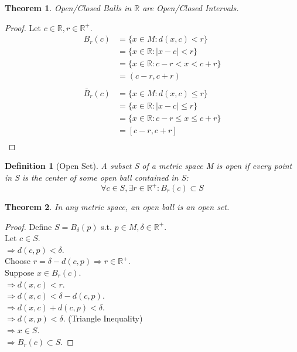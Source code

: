 \documentclass{article}
\newtheorem{definition}{Definition}[section]
\newtheorem{theorem}{Theorem}[section]
\begin{document}
			\begin{theorem}
				Open/Closed Balls in $\mathbb{R}$ are Open/Closed Intervals.
			\end{theorem}
			\begin{proof}
				Let $c \in \mathbb{R}, r \in \mathbb{R}^+$.
				\begin{align*}
					B_r(c) &= \{ x \in M: d(x, c) < r \} \\
						   &= \{ x \in \mathbb{R}: |x - c| < r \} \\
						   &= \{ x \in \mathbb{R}: c - r < x < c + r \} \\
						   &= (c - r, c + r) \\
				\end{align*}
				\begin{align*}
					\bar{B}_r(c) &= \{ x \in M: d(x, c) \leq r \} \\
						   &= \{ x \in \mathbb{R}: |x - c| \leq r \} \\
						   &= \{ x \in \mathbb{R}: c - r \leq x \leq c + r \} \\
						   &= [c - r, c + r] \\
				\end{align*}
			\end{proof}

			\begin{definition}[Open Set]
				\label{open set}
				A subset S of a metric space M is open if every point in S is the center of some open ball contained in S:
				$$\forall c \in S, \exists r \in \mathbb{R}^+: B_{r}(c) \subset S $$
			\end{definition}

			\begin{theorem}
				In any metric space, an open ball is an open set.
			\end{theorem}
			\begin{proof} 
				Define $S = B_{\delta}(p)$ s.t.  $p \in M, \delta \in \mathbb{R}^+$. \\
				Let $c \in S$. \\
				$\Rightarrow d(c, p) < \delta$. \\
				Choose $r = \delta - d(c, p) \Rightarrow r \in \mathbb{R}^+$. \\
				Suppose $x \in B_{r}(c)$. \\
				$\Rightarrow d(x, c) < r$. \\
				$\Rightarrow d(x, c) < \delta - d(c, p)$. \\
				$\Rightarrow d(x, c) + d(c, p) < \delta$. \\
				$\Rightarrow d(x, p) < \delta$. (Triangle Inequality) \\
				$\Rightarrow x \in S$. \\
				$\Rightarrow B_{r}(c) \subset S$.
			\end{proof}
\end{document}
